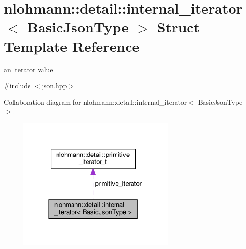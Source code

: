 \hypertarget{structnlohmann_1_1detail_1_1internal__iterator}{}\section{nlohmann\+:\+:detail\+:\+:internal\+\_\+iterator$<$ Basic\+Json\+Type $>$ Struct Template Reference}
\label{structnlohmann_1_1detail_1_1internal__iterator}


an iterator value  




{\ttfamily \#include $<$json.\+hpp$>$}



Collaboration diagram for nlohmann\+:\+:detail\+:\+:internal\+\_\+iterator$<$ Basic\+Json\+Type $>$\+:\nopagebreak
\begin{figure}[H]
\begin{center}
\leavevmode
\includegraphics[width=225pt]{structnlohmann_1_1detail_1_1internal__iterator__coll__graph}
\end{center}
\end{figure}
